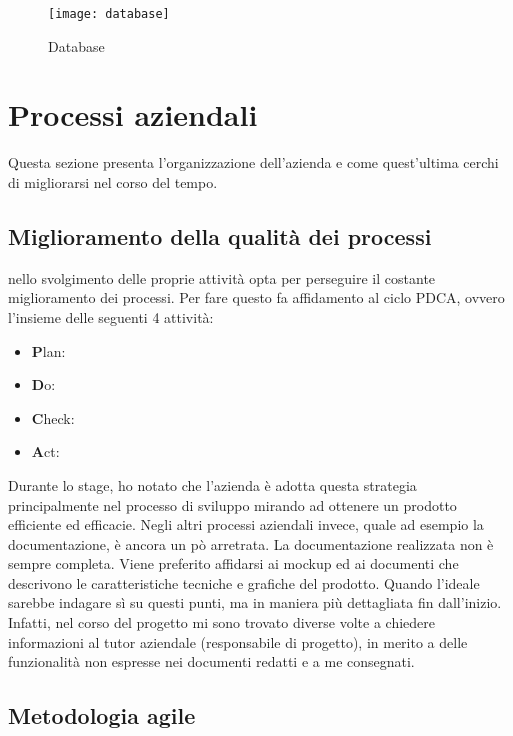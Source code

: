\begin{figure}[!h] 
	\centering 
	\texttt{[image: database]} 
	\caption{Database}
\end{figure}

\newpage

\section{Processi aziendali}
\label{cap1:Processi aziendali}

Questa sezione presenta l'organizzazione dell'azienda e come quest'ultima cerchi di migliorarsi nel corso del tempo. 

\subsection{Miglioramento della qualità dei processi}
\label{cap1:Miglioramento della qualità dei processi}

\azienda nello svolgimento delle proprie attività opta per perseguire il costante miglioramento dei
processi. Per fare questo fa affidamento al ciclo PDCA, ovvero l'insieme delle seguenti 4 attività:
\begin{itemize}
	\item \textbf{P}lan:
	\item \textbf{D}o:
	\item \textbf{C}heck:
	\item \textbf{A}ct:
\end{itemize}
Durante lo stage, ho notato che l'azienda è adotta questa strategia principalmente nel processo di sviluppo mirando ad ottenere un prodotto efficiente ed efficacie. Negli altri processi aziendali invece, quale ad esempio la documentazione, è ancora un pò arretrata. La documentazione realizzata non è sempre completa. Viene preferito affidarsi ai mock\-up ed ai documenti che descrivono le caratteristiche tecniche e grafiche del prodotto. Quando l'ideale sarebbe indagare sì su questi punti, ma in maniera più dettagliata fin dall'inizio. Infatti, nel corso del progetto mi sono trovato diverse volte a chiedere informazioni al tutor aziendale (responsabile di progetto), in merito a delle funzionalità non espresse nei documenti redatti e a me consegnati.  

\subsection{Metodologia agile}
\label{cap1:Metodologia agile}

